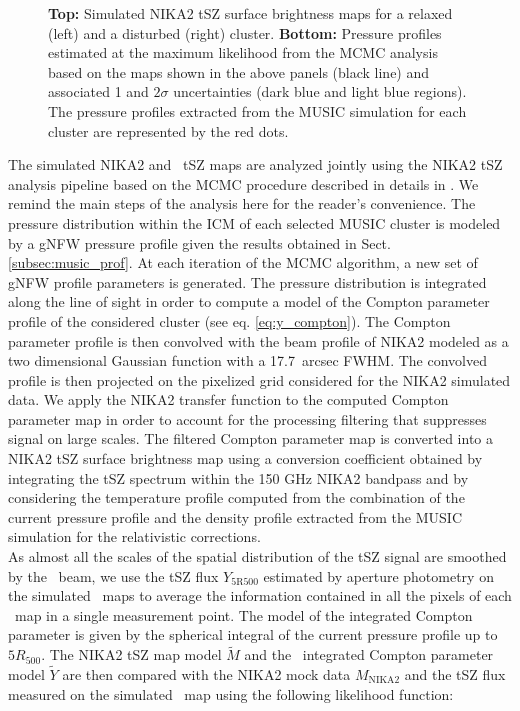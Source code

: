 \documentclass[twocolumn,traditabstract]{aa}
\begin{document}
\begin{figure}[h!]
\caption{{\footnotesize \textbf{Top:} Simulated NIKA2 tSZ surface brightness maps for a relaxed (left) and a disturbed (right) cluster. \textbf{Bottom:} Pressure profiles estimated at the maximum likelihood from the MCMC analysis based on the maps shown in the above panels (black line) and associated 1 and $2\sigma$ uncertainties (dark blue and light blue regions). The pressure profiles extracted from the MUSIC simulation for each cluster are represented by the red dots.}}
\label{fig:results_relax_disturbed}
\end{figure}

The simulated NIKA2 and \planck\ tSZ maps are analyzed jointly using the NIKA2 tSZ analysis pipeline based on the MCMC procedure described in details in \citep{rup18}. We remind the main steps of the analysis here for the reader's convenience. The pressure distribution within the ICM of each selected MUSIC cluster is modeled by a gNFW pressure profile given the results obtained in Sect. \ref{subsec:music_prof}. At each iteration of the MCMC algorithm, a new set of gNFW profile parameters is generated. The pressure distribution is integrated along the line of sight in order to compute a model of the Compton parameter profile of the considered cluster (see eq. \ref{eq:y_compton}). The Compton parameter profile is then convolved with the beam profile of NIKA2 modeled as a two dimensional Gaussian function with a 17.7~arcsec FWHM. The convolved profile is then projected on the pixelized grid considered for the NIKA2 simulated data. We apply the NIKA2 transfer function to the computed Compton parameter map in order to account for the processing filtering that suppresses signal on large scales. The filtered Compton parameter map is converted into a NIKA2 tSZ surface brightness map using a conversion coefficient obtained by integrating the tSZ spectrum within the 150 GHz NIKA2 bandpass and by considering the temperature profile computed from the combination of the current pressure profile and the density profile extracted from the MUSIC simulation for the relativistic corrections.\\
As almost all the scales of the spatial distribution of the tSZ signal are smoothed by the \planck\ beam, we use the tSZ flux $Y_{\mathrm{5R500}}$ estimated by aperture photometry on the simulated \planck\ maps to average the information contained in all the pixels of each \planck\ map in a single measurement point. The model of the integrated Compton parameter is given by the spherical integral of the current pressure profile up to $5R_{500}$. The NIKA2 tSZ map model $\tilde{M}$ and the \planck\ integrated Compton parameter model $\tilde{Y}$ are then compared with the NIKA2 mock data $M_{\mathrm{NIKA2}}$ and the tSZ flux measured on the simulated \planck\ map using the following likelihood function:
\end{document}
